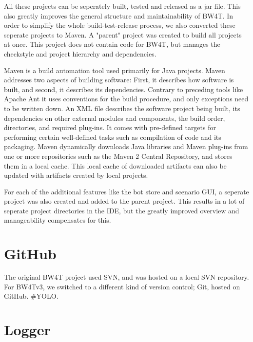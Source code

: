 All these projects can be seperately built, tested and released as a jar file. This also greatly improves the general structure and maintainability of BW4T. In order to simplify the whole build-test-release process, we also converted these seperate projects to Maven. A "parent" project was created to build all projects at once. This project does not contain code for BW4T, but manages the checkstyle and project hierarchy and dependencies. 

Maven is a build automation tool used primarily for Java projects. Maven addresses two aspects of building software: First, it describes how software is built, and second, it describes its dependencies. Contrary to preceding tools like Apache Ant it uses conventions for the build procedure, and only exceptions need to be written down. An XML file describes the software project being built, its dependencies on other external modules and components, the build order, directories, and required plug-ins. It comes with pre-defined targets for performing certain well-defined tasks such as compilation of code and its packaging. Maven dynamically downloads Java libraries and Maven plug-ins from one or more repositories such as the Maven 2 Central Repository, and stores them in a local cache. This local cache of downloaded artifacts can also be updated with artifacts created by local projects.

For each of the additional features like the bot store and scenario GUI, a seperate project was also created and added to the parent project. This results in a lot of seperate project directories in the IDE, but the greatly improved overview and manageability compensates for this. 

\section{GitHub}
The original BW4T project used SVN, and was hosted on a local SVN repository. For BW4Tv3, we switched to a different kind of version control; Git, hosted on GitHub. #YOLO.

\section{Logger}

